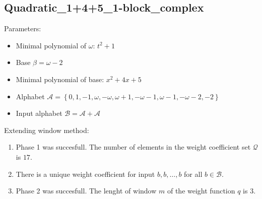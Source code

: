 \subsection{ Quadratic\_1+4+5\_1-block\_complex }

\label{subsec:Quadratic1+4+51-blockcomplex}

Parameters:
\begin{itemize}
    \item Minimal polynomial of $\omega$: $ t^{2} + 1 $
    \item Base $\beta= \omega - 2 $
    \item Minimal polynomial of base: $ x^{2} + 4x + 5 $
    \item Alphabet $\mathcal{A} =\left\{0, 1, -1, \omega, -\omega, \omega + 1, -\omega - 1, \omega - 1, -\omega - 2, -2\right\}$
    \item Input alphabet $\mathcal{B} =\mathcal{A}+ \mathcal{A}$
\end{itemize}

\noindent Extending window method:
\begin{enumerate}
    \item Phase 1 was succesfull.
The number of elements in the weight coefficient set $\mathcal{Q}$ is $17$.

    \item There is a unique weight coefficient for input $b,b,\dots,b$ for all $b\in\mathcal{B}$.

    \item Phase 2 was succesfull.
The lenght of window $m$ of the weight function $q$ is 3.
\end{enumerate}
